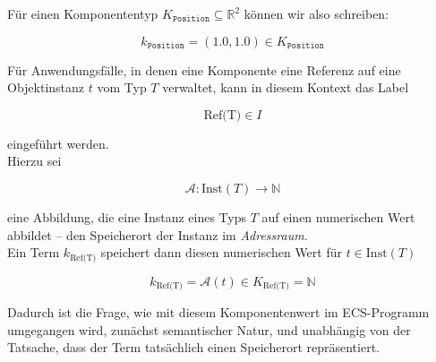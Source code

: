 \noindent
Für einen Komponententyp $K_\texttt{Position} \subseteq \mathbb{R}^2$ können wir also schreiben:

\[
    k_{\texttt{Position}} = (1.0, 1.0) \in K_\texttt{Position}
\]



\begin{tcolorbox}[title={Komponenten als Informationsträger für Referenzen}]
    Für Anwendungsfälle, in denen eine Komponente eine Referenz auf eine Objektinstanz $t$ vom Typ $T$ verwaltet, kann in diesem Kontext das Label

    \[
        \text{Ref(T)} \in I
    \]

    \noindent
    eingeführt werden.\\

    \noindent
    Hierzu sei

    \[
        \mathcal{A} \colon \text{Inst}(T) \rightarrow \mathbb{N}
    \]

    \noindent
    eine Abbildung, die eine Instanz eines Typs $T$ auf einen numerischen Wert abbildet -- den Speicherort der Instanz im \textit{Adressraum}.\\

    \noindent
    Ein Term $k_{\text{Ref(T)}}$ speichert dann diesen numerischen Wert für $t \in \text{Inst}(T)$

    \[
        k_{\text{Ref(T)}} = \mathcal{A}(t) \in K_{\text{Ref(T)}} = \mathbb{N}
    \]


    \noindent
    Dadurch ist die Frage, wie mit diesem Komponentenwert im ECS-Programm umgegangen wird, zunächst semantischer Natur, und unabhängig von der Tatsache, dass der Term tatsächlich einen Speicherort repräsentiert.
\end{tcolorbox}